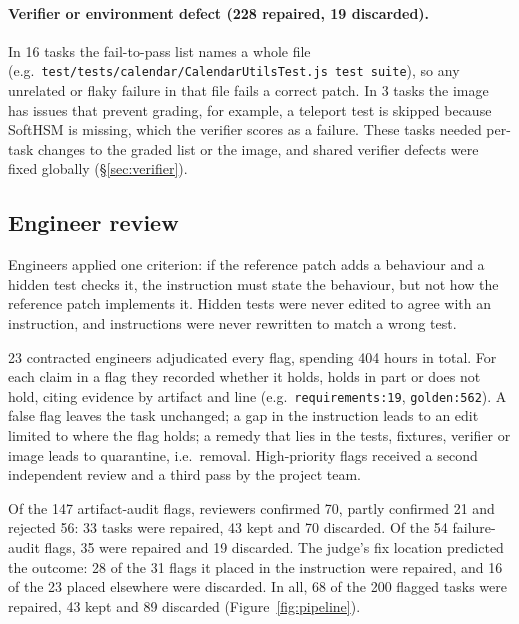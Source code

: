 \paragraph{Verifier or environment defect (228 repaired, 19 discarded).}
In 16 tasks the fail-to-pass list names a whole file (e.g.\ \texttt{test/tests/calendar/\allowbreak CalendarUtilsTest.js \textbar{} test suite}), so any unrelated or flaky failure in that file fails a correct patch. In 3 tasks the image has issues that prevent grading, for example, a teleport test is skipped because SoftHSM is missing, which the verifier scores as a failure. These tasks needed per-task changes to the graded list or the image, and shared verifier defects were fixed globally (\S\ref{sec:verifier}).



\subsection{Engineer review}
\label{sec:review}

Engineers applied one criterion: if the reference patch adds a behaviour and a hidden test checks it, the instruction must state the behaviour, but not how the reference patch implements it. Hidden tests were never edited to agree with an instruction, and instructions were never rewritten to match a wrong test.

23 contracted engineers adjudicated every flag, spending 404 hours in total. For each claim in a flag they recorded whether it holds, holds in part or does not hold, citing evidence by artifact and line (e.g.\ \texttt{requirements:19}, \texttt{golden:562}). A false flag leaves the task unchanged; a gap in the instruction leads to an edit limited to where the flag holds; a remedy that lies in the tests, fixtures, verifier or image leads to quarantine, i.e.\ removal. High-priority flags received a second independent review and a third pass by the project team.

Of the 147 artifact-audit flags, reviewers confirmed 70, partly confirmed 21 and rejected 56: 33 tasks were repaired, 43 kept and 70 discarded. Of the 54 failure-audit flags, 35 were repaired and 19 discarded. The judge's fix location predicted the outcome: 28 of the 31 flags it placed in the instruction were repaired, and 16 of the 23 placed elsewhere were discarded. In all, 68 of the 200 flagged tasks were repaired, 43 kept and 89 discarded (Figure~\ref{fig:pipeline}).

